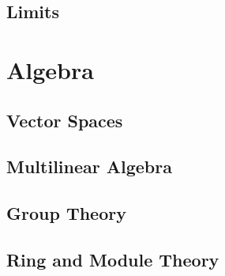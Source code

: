 \chapter{Limits}



\part{Algebra}

\chapter{Vector Spaces}










\chapter{Multilinear Algebra}







\chapter{Group Theory}






\chapter{Ring and Module Theory}






